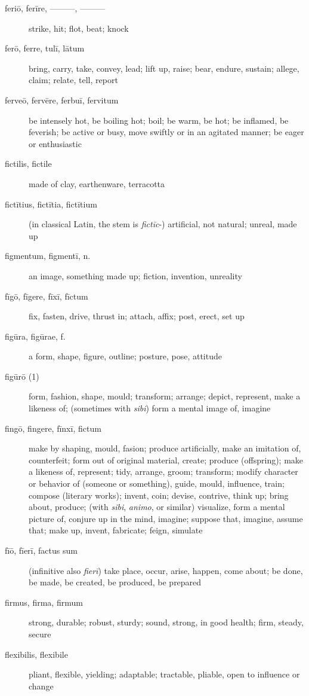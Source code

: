 \begin{description}
    \item[feriō, ferīre, ———, ———] strike, hit; flot, beat; knock
    \item[ferō, ferre, tulī, lātum] bring, carry, take, convey, lead; lift up, raise; bear, endure, sustain; allege, claim; relate, tell, report
    \item[ferveō, fervēre, ferbuī, fervitum] be intensely hot, be boiling hot; boil; be warm, be hot; be inflamed, be feverish; be active or busy, move swiftly or in an agitated manner; be eager or enthusiastic
    \item[fictilis, fictile] made of clay, earthenware, terracotta
    \item[fictītius, fictītia, fictītium]  (in classical Latin, the stem is \textit{fictīc}-) artificial, not natural; unreal, made up
    \item[figmentum, figmentī, n.] an image, something made up; fiction, invention, unreality
    \item[fīgō, fīgere, fīxī, fīctum] fix, fasten, drive, thrust in; attach, affix; post, erect, set up
    \item[figūra, figūrae, f.] a form, shape, figure, outline; posture, pose, attitude
    \item[figūrō (1)] form, fashion, shape, mould; transform; arrange; depict, represent, make a likeness of; (sometimes with \textit{sibi}) form a mental image of, imagine
    \item[fingō, fingere, fīnxī, fictum] make by shaping, mould, fasion; produce artificially, make an imitation of, counterfeit; form out of original material, create; produce (offspring); make a likeness of, represent; tidy, arrange, groom; transform; modify character or behavior of (someone or something), guide, mould, influence, train; compose (literary works); invent, coin; devise, contrive, think up; bring about, produce; (with \textit{sibi}, \textit{animo}, or similar) visualize, form a mental picture of, conjure up in the mind, imagine; suppose that, imagine, assume that; make up, invent, fabricate; feign, simulate
    \item[fīō, fīerī, factus sum] (infinitive also \textit{fierī}) take place, occur, arise, happen, come about; be done, be made, be created, be produced, be prepared
    \item[firmus, firma, firmum] strong, durable; robust, sturdy; sound, strong, in good health; firm, steady, secure
    \item[flexibilis, flexibile] pliant, flexible, yielding; adaptable; tractable, pliable, open to influence or change

\end{description}
